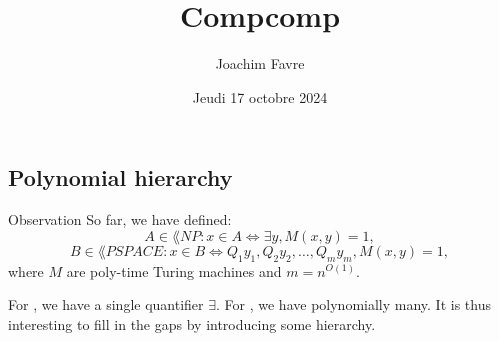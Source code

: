 \documentclass[a4paper]{article}
\title{Compcomp}
\author{Joachim Favre}
\date{Jeudi 17 octobre 2024}
\begin{document}
\maketitle


\subsection{Polynomial hierarchy}

\begin{parag}{Observation}
    So far, we have defined: 
    \[A \in \lang{NP}: x \in A \iff \exists y, M\left(x, y\right) = 1,\]
    \[B \in \lang{PSPACE}: x \in B \iff Q_1 y_1, Q_2 y_2, \ldots, Q_m y_m, M\left(x, y\right) = 1,\]
    where $M$ are poly-time Turing machines and $m = n^{O\left(1\right)}$.

    For , we have a single quantifier $\exists$. For , we have polynomially many. It is thus interesting to fill in the gaps by introducing some hierarchy.
\end{parag}
\end{document}
